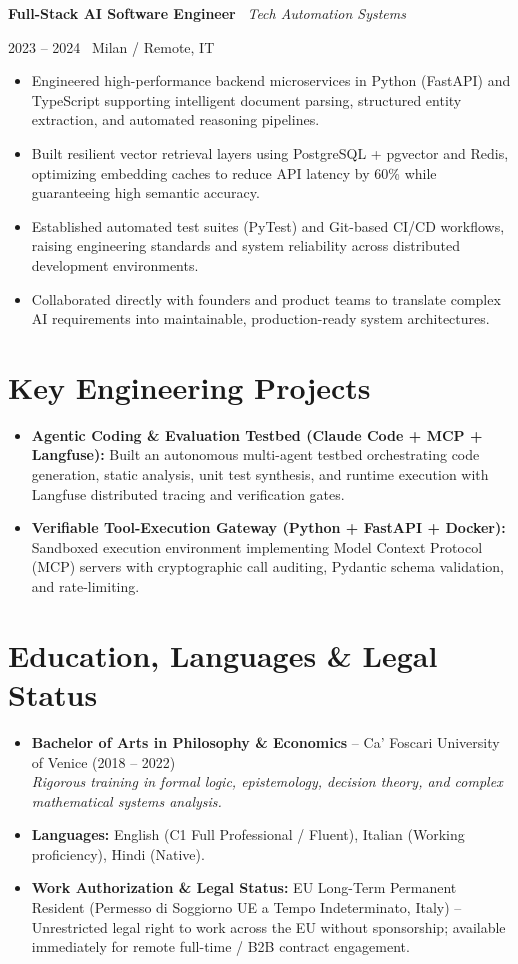 \documentclass[a4paper,10pt]{article}
\newcommand{\role}[4]{%
  \vspace{2pt}\noindent
  \begin{minipage}[t]{0.70\textwidth}\raggedright\textbf{#1} \textbullet\ \textit{#3}\end{minipage}%
  \hfill
  \begin{minipage}[t]{0.28\textwidth}\raggedleft\footnotesize\color{gray}#2 \textbullet\ #4\end{minipage}%
  \vspace{1pt}%
}
\begin{document}
\vspace{3pt}
\role{Full-Stack AI Software Engineer}{2023 -- 2024}{Tech Automation Systems}{Milan / Remote, IT}
\begin{itemize}
  \item Engineered high-performance backend microservices in Python (FastAPI) and TypeScript supporting intelligent document parsing, structured entity extraction, and automated reasoning pipelines.
  \item Built resilient vector retrieval layers using PostgreSQL + pgvector and Redis, optimizing embedding caches to reduce API latency by 60\% while guaranteeing high semantic accuracy.
  \item Established automated test suites (PyTest) and Git-based CI/CD workflows, raising engineering standards and system reliability across distributed development environments.
  \item Collaborated directly with founders and product teams to translate complex AI requirements into maintainable, production-ready system architectures.
\end{itemize}

\section{Key Engineering Projects}
\begin{itemize}
  \item \textbf{Agentic Coding \& Evaluation Testbed (Claude Code + MCP + Langfuse):} Built an autonomous multi-agent testbed orchestrating code generation, static analysis, unit test synthesis, and runtime execution with Langfuse distributed tracing and verification gates.
  \item \textbf{Verifiable Tool-Execution Gateway (Python + FastAPI + Docker):} Sandboxed execution environment implementing Model Context Protocol (MCP) servers with cryptographic call auditing, Pydantic schema validation, and rate-limiting.
\end{itemize}

\section{Education, Languages \& Legal Status}
\begin{itemize}
  \item \textbf{Bachelor of Arts in Philosophy \& Economics} -- Ca' Foscari University of Venice (2018 -- 2022) \\
  \textit{Rigorous training in formal logic, epistemology, decision theory, and complex mathematical systems analysis.}
  \item \textbf{Languages:} English (C1 Full Professional / Fluent), Italian (Working proficiency), Hindi (Native).
  \item \textbf{Work Authorization \& Legal Status:} EU Long-Term Permanent Resident (Permesso di Soggiorno UE a Tempo Indeterminato, Italy) -- Unrestricted legal right to work across the EU without sponsorship; available immediately for remote full-time / B2B contract engagement.
\end{itemize}
\end{document}

